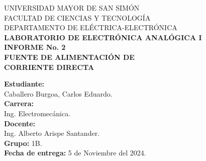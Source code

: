\documentclass[letter,twoside,11pt]{report}
\newcommand{\blankpage}{
\newpage
\thispagestyle{empty}
\mbox{}
\newpage
}
\begin{document}
\begin{titlepage}
    \begin{center}
        {\Large UNIVERSIDAD MAYOR DE SAN SIMÓN}\\
        \vspace*{0.15cm}
        {\large FACULTAD DE CIENCIAS Y TECNOLOGÍA}\\
        \vspace*{0.10cm}
        DEPARTAMENTO DE ELÉCTRICA-ELECTRÓNICA\\
        \vspace*{3.0cm}
        {\Large \textbf{LABORATORIO DE ELECTRÓNICA ANALÓGICA I}}\\
        \vspace*{0.3cm}
        {\Large \textbf{INFORME No. 2}}\\
        \vspace*{3.5cm}
        {\Large \textbf{FUENTE DE ALIMENTACIÓN DE \\
        CORRIENTE DIRECTA}}\\
    \end{center}

    \vspace*{5.8cm}
    \leftskip=7.95cm
    \noindent
    \textbf{Estudiante:}\\
    Caballero Burgoa, Carlos Eduardo.\\
    \newline
    \textbf{Carrera:}\\
    Ing. Electromecánica.\\
    \newline
    \textbf{Docente:}\\
    Ing. Alberto Arispe Santander.\\
    \newline
    \textbf{Grupo:} 1B.\\
    \textbf{Fecha de entrega:} 5 de Noviembre del 2024.\\
\end{titlepage}
\addtocounter{page}{-1}

\blankpage
\addtocounter{page}{-1}

\tableofcontents
\newpage
















\end{document}

